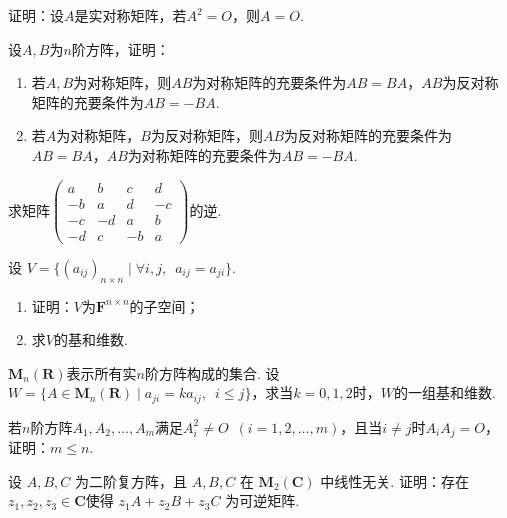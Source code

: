 \begin{exercise}
\begin{exgroup}
        \item 证明：设$A$是实对称矩阵，若$A^2=O$，则$A=O$.

        \item 设$A,B$为$n$阶方阵，证明：
        \begin{enumerate}
            \item 若$A,B$为对称矩阵，则$AB$为对称矩阵的充要条件为$AB=BA$，$AB$为反对称矩阵的充要条件为$AB=-BA$.
            \item 若$A$为对称矩阵，$B$为反对称矩阵，则$AB$为反对称矩阵的充要条件为$AB=BA$，$AB$为对称矩阵的充要条件为$AB=-BA$.
        \end{enumerate}

        \item 求矩阵$\begin{pmatrix}
                a  & b  & c  & d  \\
                -b & a  & d  & -c \\
                -c & -d & a  & b  \\
                -d & c  & -b & a
            \end{pmatrix}$的逆.

        \item 设 $V=\{(a_{ij})_{n \times n} \mid \forall i,j,\enspace a_{ij}=a_{ji}\}$.
        \begin{enumerate}
            \item 证明：$V$为$\mathbf{F}^{n \times n}$的子空间；

            \item 求$V$的基和维数.
        \end{enumerate}

        \item $\mathbf{M}_n(\mathbf{R})$表示所有实$n$阶方阵构成的集合. 设$W=\{A\in \mathbf{M}_n(\mathbf{R}) \mid a_{ji}=ka_{ij},\enspace i \leqslant j\}$，求当$k=0,1,2$时，$W$的一组基和维数.
    \end{exgroup}

    \begin{exgroup}
        \item 若$n$阶方阵$A_1,A_2,\ldots,A_m$满足$A_i^2\neq O\enspace(i=1,2,\ldots,m)$，且当$i\neq j$时$A_iA_j=O$，证明：$m\leqslant n$.

        \item 设 $A,B,C$ 为二阶复方阵，且 $A,B,C$ 在 $\mathbf{M}_2(\mathbf{C})$ 中线性无关. 证明：存在$z_1,z_2,z_3 \in \mathbf{C}$使得 $z_1A+z_2B+z_3C$ 为可逆矩阵.
    \end{exgroup}
\end{exercise}
